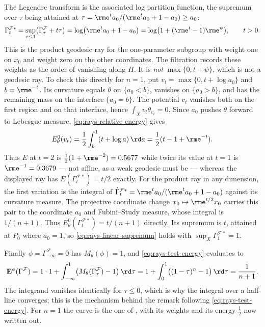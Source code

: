 \begin{example}
The Legendre transform is the associated log partition function, the
supremum over $\tau$ being attained at
$\tau=\rme^ta_0/(\rme^ta_0+1-a_0)\geq a_0$:
\[
 \Gamma_t^{\mathcal F*}
 =\sup_{\tau\leq1}\bigl(\Gamma^{\mathcal F}_\tau+t\tau\bigr)
 =\log\bigl(\rme^ta_0+1-a_0\bigr)
 =\log\bigl(1+(\rme^t-1)\rme^{\psi}\bigr),
 \qquad t>0 .
\]
This is the product geodesic ray for the one-parameter subgroup with
weight one on $x_0$ and weight zero on the other coordinates.
The filtration records these weights as the order of vanishing along $H$.
It is \emph{not}
$\max\{0,t+\psi\}$, which is not a geodesic ray.  To check this
directly for $n=1$, put $v_t=\max\{0,t+\log a_0\}$ and
$b=\rme^{-t}$.  Its curvature equals $\theta$ on $\{a_0<b\}$,
vanishes on $\{a_0>b\}$, and has the remaining mass on the
interface $\{a_0=b\}$.  The potential $v_t$ vanishes both on the
first region and on that interface, hence
$\int_Xv_t\theta_{v_t}=0$.  Since $a_0$ pushes $\theta$ forward
to Lebesgue measure, \eqref{eq:rays-relative-energy} gives
\[
 E_\theta^0(v_t)=\frac12\int_b^1(t+\log a)\,\rd a
              =\frac12(t-1+\rme^{-t}).
\]
Thus
$E$ at $t=2$ is $\tfrac12(1+\rme^{-2})=0.5677$ while twice its value
at $t=1$ is $\rme^{-1}=0.3679$ --- not affine, as a weak geodesic must
be --- whereas the displayed ray has $E(\Gamma^{\mathcal F*}_t)=t/2$
exactly.  For the product ray in any dimension, the first variation is
the integral of
$\dot\Gamma_t^{\mathcal F*}=\rme^ta_0/(\rme^ta_0+1-a_0)$
against its curvature measure.  The projective coordinate change
$x_0\mapsto\rme^{t/2}x_0$ carries this pair to the coordinate $a_0$
and Fubini--Study measure, whose integral is $1/(n+1)$.
Thus $E_\theta^0(\Gamma_t^{\mathcal F*})=t/(n+1)$ directly.
Its supremum is $t$, attained at $P_0$ where $a_0=1$, so
\eqref{eq:rays-linear-supremum} holds with
$\sup_X\Gamma_1^{\mathcal F*}=1$.

Finally $\phi=\Gamma_{-\infty}^{\mathcal F}=0$ has
$M_\theta(\phi)=1$, and \eqref{eq:rays-test-energy} evaluates to
\[
 \mathbf E^\phi(\Gamma^{\mathcal F})
 =1\cdot1+\int_{-\infty}^{1}
    \bigl(M_\theta(\Gamma_\tau^{\mathcal F})-1\bigr)\,\rd\tau
 =1+\int_0^1\bigl((1-\tau)^n-1\bigr)\,\rd\tau
 =\frac1{n+1}.
\]
The integrand vanishes identically for $\tau\leq0$, which is why the
integral over a half-line converges; this is the mechanism behind the
remark following \eqref{eq:rays-test-energy}.  For $n=1$ the curve is the
one of , with its weights and its energy
$\tfrac12$ now written out.
\end{example}


